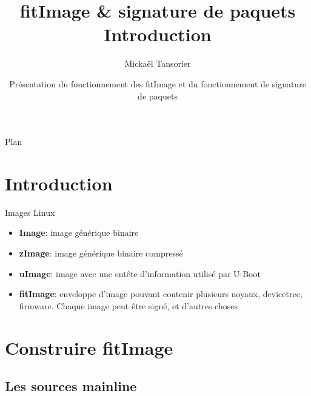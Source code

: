 \documentclass[compress,aspectratio=169]{beamer}
\title[U-Boot]{fitImage \& signature de paquets \\ \textbf{Introduction}}
\author[Mickaël Tansorier]{Mickaël Tansorier}
\date[Août 2018]{Présentation du fonctionnement des fitImage et \newline du fonctionnement de signature de paquets}
\begin{document}


\begin{frame}
\titlepage
\end{frame}




\begin{frame}{Plan}
\tableofcontents[hideallsubsections]
\end{frame}

\section{Introduction}

\begin{frame}{Images Linux}
\begin{itemize}
	\item \textbf{Image}: image générique binaire
	\item \textbf{zImage}: image générique binaire compressé
	\item \textbf{uImage}: image avec une entête d'information utilisé par U-Boot
	\item \textbf{fitImage}: enveloppe d'image pouvant contenir plusieurs noyaux, devicetree, firmware. Chaque image peut être signé, et d'autres choses
\end{itemize}
\end{frame}

{

}

{

}


\section{Construire fitImage}

\subsection{Les sources mainline}
\end{document}
